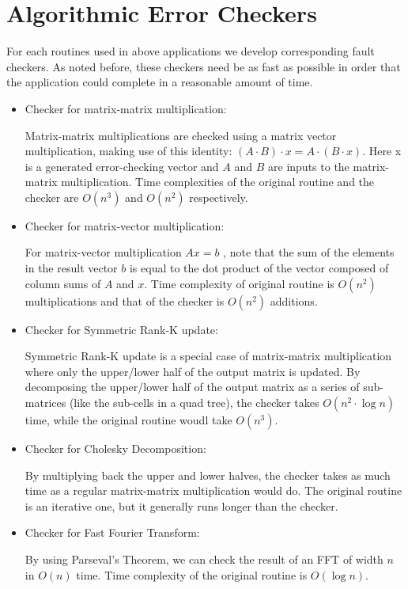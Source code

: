 \documentclass{article}
\begin{document}
\section{Algorithmic Error Checkers}

For each routines used in above applications we develop corresponding fault checkers. As noted before, these checkers need be as fast as possible in order that the application could complete in a reasonable amount of time.

\begin{itemize}
\item{Checker for matrix-matrix multiplication:

Matrix-matrix multiplications are checked using a matrix vector multiplication, making use of this identity: $(A \cdot B) \cdot x = A \cdot (B \cdot x)$. Here x is a generated error-checking vector and $A$ and $B$ are inputs to the matrix-matrix multiplication. Time complexities of the original routine and the checker are $O(n^3)$ and $O(n^2)$ respectively.
}

\item{Checker for matrix-vector multiplication:

For matrix-vector multiplication $Ax=b$ , note that the sum of the elements in the result vector $b$ is equal to the dot product of the vector composed of column sums of $A$ and $x$. Time complexity of original routine is $O(n^2)$ multiplications and that of the checker is $O(n^2)$ additions.
}

\item{Checker for Symmetric Rank-K update:

Symmetric Rank-K update is a special case of matrix-matrix multiplication where only the upper/lower half of the output matrix is updated. By decomposing the upper/lower half of the output matrix as a series of sub-matrices (like the sub-cells in a quad tree), the checker takes $O(n^2 \cdot \log{n})$ time, while the original routine woudl take $O(n^3)$.
}

\item{Checker for Cholesky Decomposition:

By multiplying back the upper and lower halves, the checker takes as much time as a regular matrix-matrix multiplication would do. The original routine is an iterative one, but it generally runs longer than the checker.
}

\item{Checker for Fast Fourier Transform:

By using Parseval's Theorem, we can check the result of an FFT of width $n$ in $O(n)$ time. Time complexity of the original routine is $O(\log{n})$.
}

\end{itemize}
\end{document}
